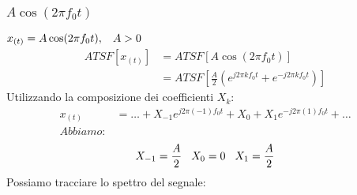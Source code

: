             \subsubsection{$A\cos(2\pi f_0 t)$}
                $x_{(t)}=A\cos(2\pi f_0 t), \hspace{0.3cm} A>0$
                \begin{align}
                    ATSF[x_{(t)}] & = ATSF[A\cos(2\pi f_0 t)] \nonumber \\
                        & = ATSF[\frac{A}{2} (e^{j2\pi kf_0t} + e^{-j2\pi kf_0t})] \nonumber 
                \end{align}
                Utilizzando la composizione dei coefficienti $X_k$:
                \begin{align}
                    x_{(t)} & =\ldots  + X_{-1} e^{j2\pi (-1)f_0t} + X_{0} + X_{1} e^{-j2\pi (1) f_0t} + \ldots \nonumber\\
                    Abbiamo:& \nonumber 
                \end{align}
                        \[X_{-1} = \frac{A}{2}\hspace{.3cm} X_{0} = 0\hspace{.3cm} X_{1} = \frac{A}{2}\] 
                Possiamo tracciare lo spettro del segnale:
